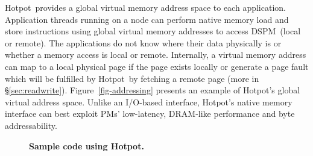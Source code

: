 \documentclass[sigconf]{acmart}
\newcommand{\DIFaddFL}[1]{}
\renewcommand{\em}{\it}
\newcommand{\mycaption}[3]{\caption{\label{#1}{\bf #2} \em\small #3}}
\newcommand{\dsnvm}{DSPM}
\newcommand{\nvm}{PM}
\newcommand{\hotpot}{Hotpot}
\providecommand{\DIFadd}[1]{{\protect\color{blue}\uwave{#1}}} %
\providecommand{\DIFdel}[1]{{\protect\color{red}\sout{#1}}}                      %
\providecommand{\DIFaddbegin}{} %
\providecommand{\DIFaddend}{} %
\providecommand{\DIFdelbegin}{} %
\providecommand{\DIFdelend}{} %
\providecommand{\DIFaddFL}[1]{\DIFadd{#1}} %
\begin{document}
{%
\DIFdelend \hotpot\ provides a global virtual memory address space to each application.
Application threads running on a node can perform native memory load and store instructions using global virtual memory addresses 
to access \dsnvm\ (local or remote).
The applications do not know where their data physically is or whether a memory access is local or remote.
Internally, a virtual memory address can map to a local physical page if the page exists locally or 
generate a page fault which will be fulfilled by \hotpot\ by fetching a remote page (more in \DIFdelbegin \DIFdel{\S}\DIFdelend \DIFaddbegin \DIFadd{Section }\DIFaddend \ref{sec:readwrite}). 
Figure~\ref{fig-addressing} presents an example of \hotpot's global virtual address space.
Unlike an I/O-based interface, \hotpot's native memory interface can best exploit \nvm{}s' low-latency, DRAM-like performance and byte addressability.

\DIFaddbegin {
\begin{figure}[th]
\begin{center}
\scriptsize

\mycaption{fig-code-eg}{Sample code using \hotpot.}
{
\DIFaddFL{Code snippet that implements a simple log append operation with \hotpot. 
}}
\end{center}
\end{figure}
}


}
\end{document}
